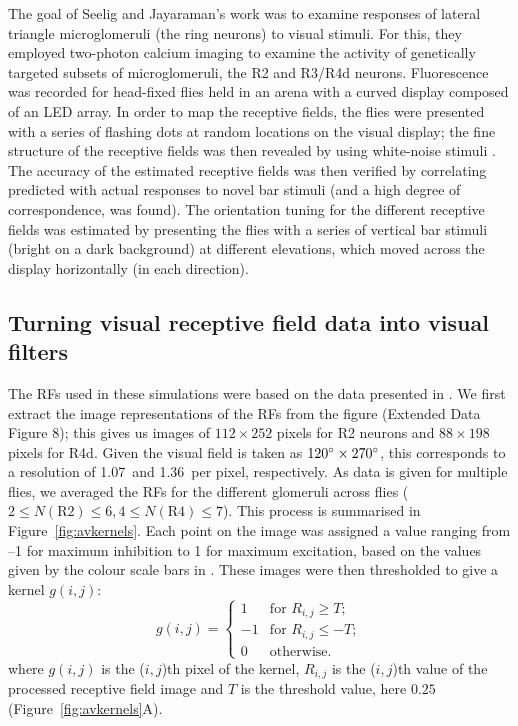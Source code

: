 \documentclass[10pt]{article}
\begin{document}
The goal of Seelig and Jayaraman's \cite{Seelig2013} work was to examine responses of lateral triangle microglomeruli (the ring neurons) to visual stimuli.
For this, they employed two-photon calcium imaging to examine the activity of genetically targeted subsets of microglomeruli, the R2 and R3/R4d neurons.
Fluorescence was recorded for head-fixed flies held in an arena with a curved display composed of an LED array.
In order to map the receptive fields, the flies were presented with a series of flashing dots at random locations on the visual display; the fine structure of the receptive fields was then revealed by using white-noise stimuli \cite{Weber2010}.
The accuracy of the estimated receptive fields was then verified by correlating predicted with actual responses to novel bar stimuli (and a high degree of correspondence, was found).
The orientation tuning for the different receptive fields was estimated by presenting the flies with a series of vertical bar stimuli (bright on a dark background) at different elevations, which moved across the display horizontally (in each direction).

\subsection{Turning visual receptive field data into visual filters}
\label{sec:methods:preprocessing}
The RFs used in these simulations were based on the data presented in \cite{Seelig2013}.
We first extract the image representations of the RFs from the figure (Extended Data Figure 8); this gives us images of $112\times 252$ pixels for R2 neurons and $88\times 198$ pixels for R4d.
Given the visual field is taken as $120\degree\times 270\degree$, this corresponds to a resolution of 1.07\degree\ and 1.36\degree\ per pixel, respectively.
As data is given for multiple flies, we averaged the RFs for the different glomeruli across flies ($2\le N(\mathrm{R2}) \le 6, 4\le N(\mathrm{R4})\le 7$). This process is summarised in Figure~\ref{fig:avkernels}. Each point on the image was assigned a value ranging from --1 for maximum inhibition to 1 for maximum excitation, based on the values given by the colour scale bars in \cite{Seelig2013}.
These images were then thresholded to give a kernel $g(i,j)$:
$$
g(i,j) = \left\{ \begin{array}{rl}
1 & \mbox{for } R_{i,j} \ge T; \\
-1 & \mbox{for } R_{i,j} \le -T; \\
0 & \mbox{otherwise.}
\end{array}
\right.
$$
where $g(i,j)$ is the ($i,j$)th pixel of the kernel, $R_{i,j}$ is the ($i,j$)th value of the processed receptive field image and $T$ is the threshold value, here $0.25$ (Figure~\ref{fig:avkernels}A).
\end{document}
